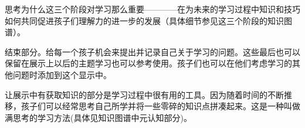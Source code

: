 \par
      思考为什么这三个阶段对学习那么重要————在为未来的学习过程中知识和技巧如何共同促进孩子们理解力的进一步的发展（具体细节参见这三个阶段的知识图谱）。\par
      结束部分。给每一个孩子机会来提出并记录自己关于学习的问题。这些最后也可以保留在展示上以后的主题学习也可以参考使用。孩子们也可以在他们考虑学习的其他问题时添加到这个显示中。\par
      让展示中有获取知识的部分是学习过程中很有用的工具。因为随着时间的不断推移，孩子们可以经常思考自己所学并将一些零碎的知识点拼凑起来。这是一种叫做满思考的学习方法(具体见知识图谱中元认知部分)。

      
     
